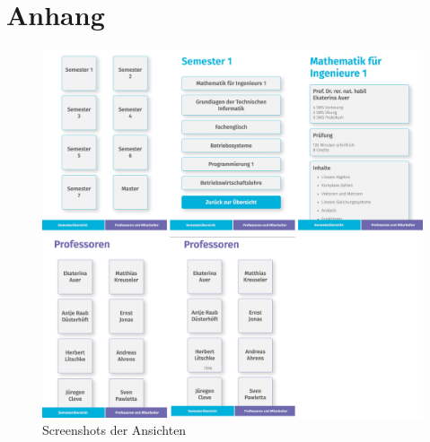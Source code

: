 \documentclass[12pt,					%
							 oneside,			%
							 a4paper,			%
							 halfparskip,		%
							 liststotoc,			%
							 bibtotoc,			%
							 fleqn,				%
							 pointlessnumbers]	%
							 {scrreprt}
\begin{document}
	\listoffigures						%

	\appendix
	\newpage
\section*{Anhang}
\setcounter{figure}{0}
\renewcommand{\thefigure}{\Alph{figure}}
\begin{figure}[h]
	\centering
	\includegraphics[width=1\textwidth]{pictures/anhang}
	\caption{Screenshots der Ansichten} 
	\label{filtercode}
\end{figure}
\end{document}
